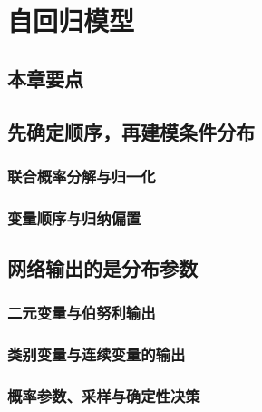 \chapter{自回归模型}
\label{chap:ar}

\section*{本章要点}
\contentplaceholder

\section{先确定顺序，再建模条件分布}
\label{sec:ar-ordering}
\contentplaceholder

\subsection{联合概率分解与归一化}
\label{subsec:ar-chain-rule}
\contentplaceholder

\subsection{变量顺序与归纳偏置}
\label{subsec:ar-inductive-bias}
\contentplaceholder

\section{网络输出的是分布参数}
\label{sec:ar-outputs}
\contentplaceholder

\subsection{二元变量与伯努利输出}
\label{subsec:ar-binary}
\contentplaceholder

\subsection{类别变量与连续变量的输出}
\label{subsec:ar-categorical-continuous}
\contentplaceholder

\subsection{概率参数、采样与确定性决策}
\label{subsec:ar-sampling-decisions}
\contentplaceholder

